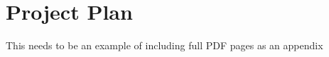 \chapter{Project Plan}
\label{app:plan}

This needs to be an example of including full PDF pages as an appendix
